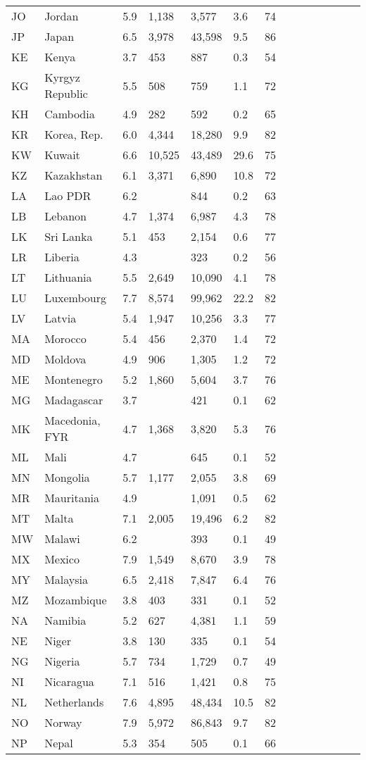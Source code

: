 \begin{scriptsize}
\begin{center}
\begin{longtable}{llllllllllllll}
JO&Jordan&5.9&1,138&3,577&3.6&74\\
JP&Japan&6.5&3,978&43,598&9.5&86\\
KE&Kenya&3.7&453&887&0.3&54\\
KG&Kyrgyz Republic&5.5&508&759&1.1&72\\
KH&Cambodia&4.9&282&592&0.2&65\\
KR&Korea, Rep.&6.0&4,344&18,280&9.9&82\\
KW&Kuwait&6.6&10,525&43,489&29.6&75\\
KZ&Kazakhstan&6.1&3,371&6,890&10.8&72\\
LA&Lao PDR&6.2&&844&0.2&63\\
LB&Lebanon&4.7&1,374&6,987&4.3&78\\
LK&Sri Lanka&5.1&453&2,154&0.6&77\\
LR&Liberia&4.3&&323&0.2&56\\
LT&Lithuania&5.5&2,649&10,090&4.1&78\\
LU&Luxembourg&7.7&8,574&99,962&22.2&82\\
LV&Latvia&5.4&1,947&10,256&3.3&77\\
MA&Morocco&5.4&456&2,370&1.4&72\\
MD&Moldova&4.9&906&1,305&1.2&72\\
ME&Montenegro&5.2&1,860&5,604&3.7&76\\
MG&Madagascar&3.7&&421&0.1&62\\
MK&Macedonia, FYR&4.7&1,368&3,820&5.3&76\\
ML&Mali&4.7&&645&0.1&52\\
MN&Mongolia&5.7&1,177&2,055&3.8&69\\
MR&Mauritania&4.9&&1,091&0.5&62\\
MT&Malta&7.1&2,005&19,496&6.2&82\\
MW&Malawi&6.2&&393&0.1&49\\
MX&Mexico&7.9&1,549&8,670&3.9&78\\
MY&Malaysia&6.5&2,418&7,847&6.4&76\\
MZ&Mozambique&3.8&403&331&0.1&52\\
NA&Namibia&5.2&627&4,381&1.1&59\\
NE&Niger&3.8&130&335&0.1&54\\
NG&Nigeria&5.7&734&1,729&0.7&49\\
NI&Nicaragua&7.1&516&1,421&0.8&75\\
NL&Netherlands&7.6&4,895&48,434&10.5&82\\
NO&Norway&7.9&5,972&86,843&9.7&82\\
NP&Nepal&5.3&354&505&0.1&66\\

\end{longtable}
\end{center}
\end{scriptsize}
